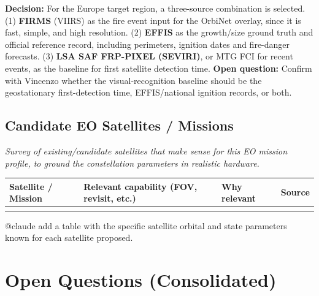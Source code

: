 \documentclass[11pt]{article}
\newcommand{\openquestion}[1]{\textcolor{openq}{\textbf{Open question:}} #1}
\begin{document}
\noindent\textbf{Decision:} For the Europe target region, a three-source combination is selected.
(1) \textbf{FIRMS} (VIIRS) as the fire event input for the OrbiNet overlay, since it is fast, simple, and high resolution.
(2) \textbf{EFFIS} as the growth/size ground truth and official reference record, including perimeters, ignition dates and fire-danger forecasts.
(3) \textbf{LSA SAF FRP-PIXEL (SEVIRI)}, or MTG FCI for recent events, as the baseline for first satellite detection time.
\openquestion{Confirm with Vincenzo whether the visual-recognition baseline should be the geostationary first-detection time, EFFIS/national ignition records, or both.}

\subsection{Candidate EO Satellites / Missions}
\textit{Survey of existing/candidate satellites that make sense for this EO mission profile, to ground the constellation parameters in realistic hardware.}

\begin{longtable}{p{3cm}p{4cm}p{4cm}p{3cm}}
\toprule
\textbf{Satellite / Mission} & \textbf{Relevant capability (FOV, revisit, etc.)} & \textbf{Why relevant} & \textbf{Source} \\
\midrule
\endhead
& & & \\
\bottomrule
\end{longtable}

@claude add a table with the specific satellite orbital and state parameters known for each satellite proposed. 



\section{Open Questions (Consolidated)}
\end{document}
